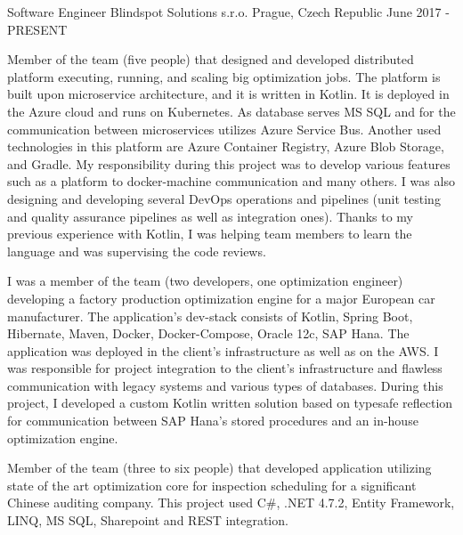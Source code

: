
\begin{cventries}
		
	\cventry
	{Software Engineer}
	{Blindspot Solutions s.r.o.}
	{Prague, Czech Republic}
	{June 2017 - PRESENT}
	{
		\begin{cvitems}
			\item {
				Member of the team (five people) that designed and developed distributed platform executing, running, and scaling big optimization jobs. 
				The platform is built upon microservice architecture, and it is written in Kotlin. It is deployed in the Azure cloud and runs on Kubernetes. 
			 	As database serves MS SQL and for the communication between microservices utilizes Azure Service Bus. 
			 	Another used technologies in this platform are Azure Container Registry, Azure Blob Storage, and Gradle.
			 	\newline
			 	My responsibility during this project was to develop various features such as a platform to docker-machine communication and many others.
				I was also designing and developing several DevOps operations and pipelines 
				(unit testing and quality assurance pipelines as well as integration ones).
				Thanks to my previous experience with Kotlin, I was helping team members to learn the language and was supervising the code reviews.
			}
			\item {
				I was a member of the team (two developers, one optimization engineer) developing a factory production optimization engine
				for a major European car manufacturer. 
				The application's dev-stack consists of Kotlin, Spring Boot, Hibernate, Maven, Docker, Docker-Compose, Oracle 12c, SAP Hana. 
				The application was deployed in the client's infrastructure as well as on the AWS.
				\newline
				I was responsible for project integration to the client's infrastructure and flawless communication with legacy systems 
				and various types of databases.
				During this project, I developed a custom Kotlin written solution based on typesafe reflection for communication
				between SAP Hana's stored procedures and an in-house optimization engine.
			}
			\item {
				Member of the team (three to six people) that developed application utilizing state of the art optimization core 
				for inspection scheduling for a significant Chinese auditing company. 
				This project used C\#, .NET 4.7.2, Entity Framework, LINQ, MS SQL, Sharepoint and REST integration.
				\newline
}
\end{cvitems}}
\end{cventries}
